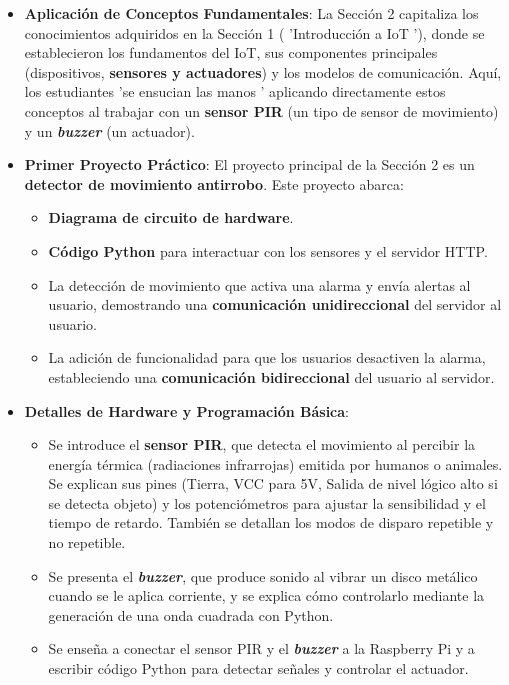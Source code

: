 \documentclass{report}
\begin{document}
\begin{itemize}
    \item \textbf{Aplicación de Conceptos Fundamentales}: La Sección 2 capitaliza los conocimientos adquiridos en la Sección 1 ( 'Introducción a IoT '), 
    donde se establecieron los fundamentos del IoT, sus componentes principales (dispositivos, \textbf{sensores y actuadores}) y los modelos de comunicación. 
    Aquí, los estudiantes  'se ensucian las manos ' aplicando directamente estos conceptos al trabajar con un \textbf{sensor PIR} (un tipo de sensor de 
    movimiento) y un \textbf{\textit{buzzer}} (un actuador).
    
    \item \textbf{Primer Proyecto Práctico}: El proyecto principal de la Sección 2 es un \textbf{detector de movimiento antirrobo}. Este proyecto abarca:
    \begin{itemize}
        \item \textbf{Diagrama de circuito de hardware}.
        \item \textbf{Código Python} para interactuar con los sensores y el servidor HTTP.
        \item La detección de movimiento que activa una alarma y envía alertas al usuario, demostrando una \textbf{comunicación unidireccional} del servidor 
        al usuario.
        \item La adición de funcionalidad para que los usuarios desactiven la alarma, estableciendo una \textbf{comunicación bidireccional} del usuario al 
        servidor.
    \end{itemize}
    
    \item \textbf{Detalles de Hardware y Programación Básica}:
    \begin{itemize}
        \item Se introduce el \textbf{sensor PIR}, que detecta el movimiento al percibir la energía térmica (radiaciones infrarrojas) emitida por humanos 
        o animales. Se explican sus pines (Tierra, VCC para 5V, Salida de nivel lógico alto si se detecta objeto) y los potenciómetros para ajustar la 
        sensibilidad y el tiempo de retardo. También se detallan los modos de disparo repetible y no repetible.
        \item Se presenta el \textbf{\textit{buzzer}}, que produce sonido al vibrar un disco metálico cuando se le aplica corriente, y se explica cómo 
        controlarlo mediante la generación de una onda cuadrada con Python.
        \item Se enseña a conectar el sensor PIR y el \textbf{\textit{buzzer}} a la Raspberry Pi y a escribir código Python para detectar señales y 
        controlar el actuador.
    \end{itemize}
    

\end{itemize}
\end{document}
